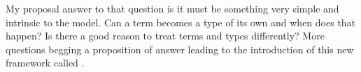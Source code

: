 My proposal answer to that question is it must be something very simple and intrinsic to the model. Can a term becomes a type of its own and when does that happen? Is there a good reason to treat terms and types differently?
More questions begging a proposition of answer leading to the introduction of this new framework called \lambdatypes.